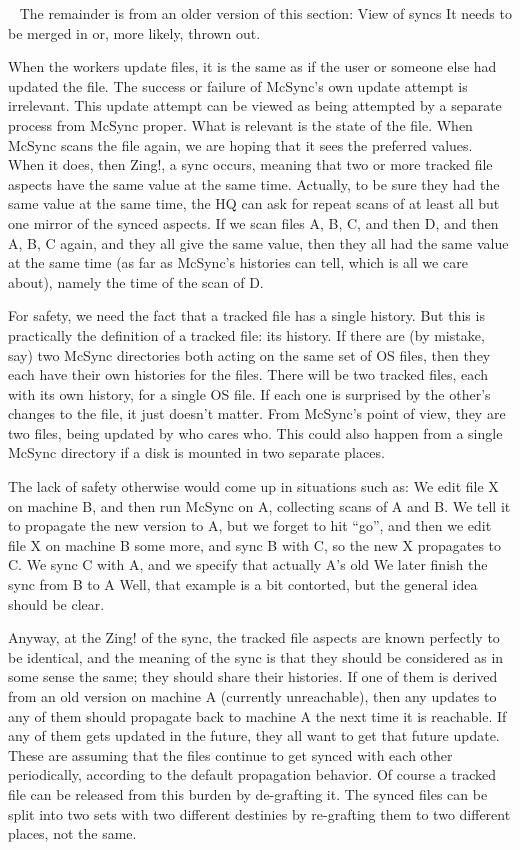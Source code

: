 \documentclass{book}
\begin{document}
~
       The remainder is from an older version of this section:  View of syncs    It needs to be merged in or, more likely, thrown out.

When the workers update files, it is the same as if the user or someone else had updated the file.  The success or failure of McSync's own update attempt is irrelevant.  This update attempt can be viewed as being attempted by a separate process from McSync proper.  What is relevant is the state of the file.  When McSync scans the file again, we are hoping that it sees the preferred values.  When it does, then Zing!, a sync occurs, meaning that two or more tracked file aspects have the same value at the same time.  Actually, to be sure they had the same value at the same time, the HQ can ask for repeat scans of at least all but one mirror of the synced aspects.  If we scan files A, B, C, and then D, and then A, B, C again, and they all give the same value, then they all had the same value at the same time (as far as McSync's histories can tell, which is all we care about), namely the time of the scan of D.

For safety, we need the fact that a tracked file has a single history.  But this is practically the definition of a tracked file: its history.  If there are (by mistake, say) two McSync directories both acting on the same set of OS files, then they each have their own histories for the files.  There will be two tracked files, each with its own history, for a single OS file.  If each one is surprised by the other's changes to the file, it just doesn't matter.  From McSync's point of view, they are two files, being updated by who cares who.  This could also happen from a single McSync directory if a disk is mounted in two separate places.

The lack of safety otherwise would come up in situations such as:  We edit file X on machine B, and then run McSync on A, collecting scans of A and B.  We tell it to propagate the new version to A, but we forget to hit ``go'', and then we edit file X on machine B some more, and sync B with C, so the new X propagates to C.  We sync C with A, and we specify that actually A's old
We later finish the sync from B to A
Well, that example is a bit contorted, but the general idea should be clear.

Anyway, at the Zing! of the sync, the tracked file aspects are known perfectly to be identical, and the meaning of the sync is that they should be considered as in some sense the same; they should share their histories.  If one of them is derived from an old version on machine A (currently unreachable), then any updates to any of them should propagate back to machine A the next time it is reachable.  If any of them gets updated in the future, they all want to get that future update.  These are assuming that the files continue to get synced with each other periodically, according to the default propagation behavior.  Of course a tracked file can be released from this burden by de-grafting it.  The synced files can be split into two sets with two different destinies by re-grafting them to two different places, not the same.
\end{document}
